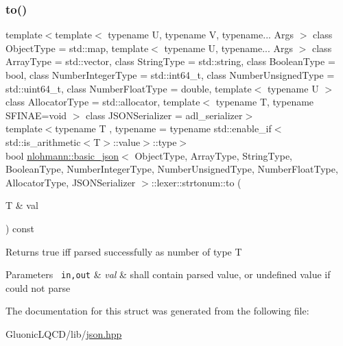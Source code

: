 \subsubsection{\texorpdfstring{to()}{to()}}
{\footnotesize\ttfamily template$<$template$<$ typename U, typename V, typename... Args $>$ class Object\+Type = std\+::map, template$<$ typename U, typename... Args $>$ class Array\+Type = std\+::vector, class String\+Type  = std\+::string, class Boolean\+Type  = bool, class Number\+Integer\+Type  = std\+::int64\+\_\+t, class Number\+Unsigned\+Type  = std\+::uint64\+\_\+t, class Number\+Float\+Type  = double, template$<$ typename U $>$ class Allocator\+Type = std\+::allocator, template$<$ typename T, typename S\+F\+I\+N\+A\+E=void $>$ class J\+S\+O\+N\+Serializer = adl\+\_\+serializer$>$ \\
template$<$typename T , typename  = typename std\+::enable\+\_\+if$<$std\+::is\+\_\+arithmetic$<$\+T$>$\+::value$>$\+::type$>$ \\
bool \mbox{\hyperlink{classnlohmann_1_1basic__json}{nlohmann\+::basic\+\_\+json}}$<$ Object\+Type, Array\+Type, String\+Type, Boolean\+Type, Number\+Integer\+Type, Number\+Unsigned\+Type, Number\+Float\+Type, Allocator\+Type, J\+S\+O\+N\+Serializer $>$\+::lexer\+::strtonum\+::to (\begin{DoxyParamCaption}\item[{T \&}]{val }\end{DoxyParamCaption}) const\hspace{0.3cm}{\ttfamily [inline]}}

\begin{DoxyReturn}{Returns}
true iff parsed successfully as number of type T
\end{DoxyReturn}

\begin{DoxyParams}[1]{Parameters}
\mbox{\texttt{ in,out}}  & {\em val} & shall contain parsed value, or undefined value if could not parse \\
\hline
\end{DoxyParams}


The documentation for this struct was generated from the following file\+:\begin{DoxyCompactItemize}
\item 
Gluonic\+L\+Q\+C\+D/lib/\mbox{\hyperlink{json_8hpp}{json.\+hpp}}\end{DoxyCompactItemize}
